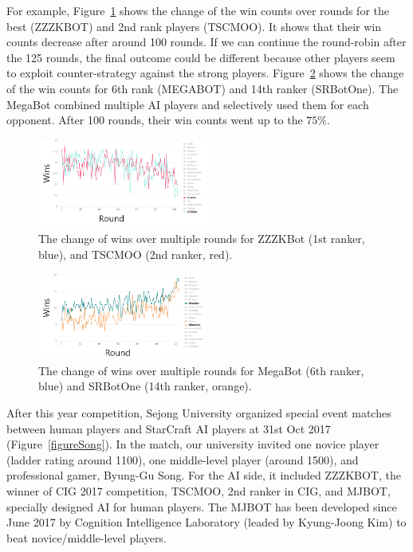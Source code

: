 For example, Figure~\ref{figureCIGZZZTSCMOO} shows the change of the win counts over rounds for the best (ZZZKBOT) and 2nd rank players (TSCMOO). It shows that their win counts decrease after around 100 rounds. If we can continue the round-robin after the 125 rounds, the final outcome could be different because other players seem to exploit counter-strategy against the strong players. Figure~\ref{figureCIGMEGASRBOT} shows the change of the win counts for 6th rank (MEGABOT) and 14th ranker (SRBotOne). The MegaBot combined multiple AI players and selectively used them for each opponent. After 100 rounds, their win counts went up to the $75\%$. 

\begin{figure}[h]
  \centering
  \includegraphics[width=0.5\textwidth]{fig/cig-tscmoo-zzzkbot-winrate.png}
  \caption{The change of wins over multiple rounds for ZZZKBot (1st ranker, blue), and TSCMOO (2nd ranker, red).}
  \label{figureCIGZZZTSCMOO}
\end{figure} 

\begin{figure}[h]
  \centering
  \includegraphics[width=0.5\textwidth]{fig/cig-megabot-srbotone.png}
  \caption{The change of wins over multiple rounds for MegaBot (6th ranker, blue) and SRBotOne (14th ranker, orange).}
  \label{figureCIGMEGASRBOT}
\end{figure} 


After this year competition, Sejong University organized special event matches between human players and StarCraft AI players at 31st Oct 2017 (Figure~\ref{figureSong}). In the match, our university invited one novice player (ladder rating around 1100), one middle-level player (around 1500), and professional gamer, Byung-Gu Song. For the AI side, it included ZZZKBOT, the winner of CIG 2017 competition, TSCMOO, 2nd ranker in CIG, and MJBOT, specially designed AI for human players. The MJBOT has been developed since June 2017 by Cognition Intelligence Laboratory (leaded by Kyung-Joong Kim) to beat novice/middle-level players. 

